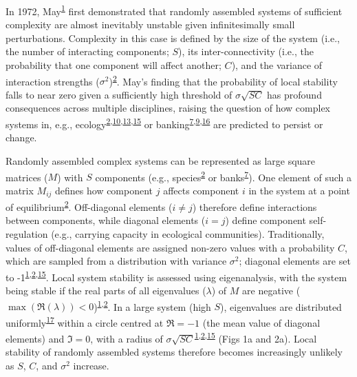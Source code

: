\documentclass[]{article}
\begin{document}
In 1972, May\textsuperscript{\protect\hyperlink{ref-May1972}{1}} first
demonstrated that randomly assembled systems of sufficient complexity
are almost inevitably unstable given infinitesimally small
perturbations. Complexity in this case is defined by the size of the
system (i.e., the number of interacting components; \(S\)), its
inter-connectivity (i.e., the probability that one component will affect
another; \(C\)), and the variance of interaction strengths
(\(\sigma^{2}\))\textsuperscript{\protect\hyperlink{ref-Allesina2012}{2}}.
May's finding that the probability of local stability falls to near zero
given a sufficiently high threshold of \(\sigma\sqrt{SC}\) has profound
consequences across multiple disciplines, raising the question of how
complex systems in, e.g.,
ecology\textsuperscript{\protect\hyperlink{ref-Allesina2012}{2},\protect\hyperlink{ref-Mougi2012}{10},\protect\hyperlink{ref-Grilli2017}{13},\protect\hyperlink{ref-Allesina2015}{15}}
or
banking\textsuperscript{\protect\hyperlink{ref-Haldane2011}{7},\protect\hyperlink{ref-Bardoscia2017}{9},\protect\hyperlink{ref-May2008}{16}}
are predicted to persist or change.

Randomly assembled complex systems can be represented as large square
matrices (\(M\)) with \(S\) components (e.g.,
species\textsuperscript{\protect\hyperlink{ref-Allesina2012}{2}} or
banks\textsuperscript{\protect\hyperlink{ref-Haldane2011}{7}}). One
element of such a matrix \(M_{ij}\) defines how component \(j\) affects
component \(i\) in the system at a point of
equilibrium\textsuperscript{\protect\hyperlink{ref-Allesina2012}{2}}.
Off-diagonal elements (\(i \neq j\)) therefore define interactions
between components, while diagonal elements (\(i = j\)) define component
self-regulation (e.g., carrying capacity in ecological communities).
Traditionally, values of off-diagonal elements are assigned non-zero
values with a probability \(C\), which are sampled from a distribution
with variance \(\sigma^{2}\); diagonal elements are set to
-1\textsuperscript{\protect\hyperlink{ref-May1972}{1},\protect\hyperlink{ref-Allesina2012}{2},\protect\hyperlink{ref-Allesina2015}{15}}.
Local system stability is assessed using eigenanalysis, with the system
being stable if the real parts of all eigenvalues (\(\lambda\)) of \(M\)
are negative
(\(\max\left(\Re(\lambda)\right) < 0\))\textsuperscript{\protect\hyperlink{ref-May1972}{1},\protect\hyperlink{ref-Allesina2012}{2}}.
In a large system (high \(S\)), eigenvalues are distributed
uniformly\textsuperscript{\protect\hyperlink{ref-Tao2010}{17}} within a
circle centred at \(\Re = -1\) (the mean value of diagonal elements) and
\(\Im = 0\), with a radius of
\(\sigma\sqrt{SC}\)\textsuperscript{\protect\hyperlink{ref-May1972}{1},\protect\hyperlink{ref-Allesina2012}{2},\protect\hyperlink{ref-Allesina2015}{15}}
(Figs 1a and 2a). Local stability of randomly assembled systems
therefore becomes increasingly unlikely as \(S\), \(C\), and
\(\sigma^{2}\) increase.
\end{document}
